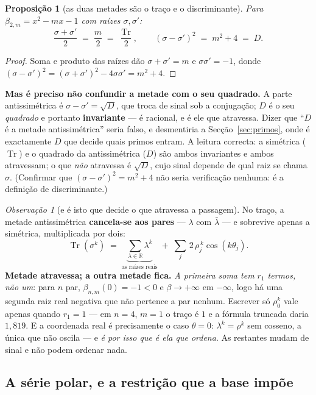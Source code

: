 \documentclass[11pt,a4paper]{article}
\theoremstyle{plain}
\newtheorem{proposicao}[teorema]{Proposição}
\theoremstyle{definition}
\theoremstyle{remark}
\newtheorem{obs}[teorema]{Observação}
\newcommand{\R}{\mathbb{R}}
\begin{document}
\begin{proposicao}[as duas metades são o traço e o discriminante]\label{prop:metades}
Para $\beta_{2,m} = x^2-mx-1$ com raízes $\sigma,\sigma'$:
\[
  \frac{\sigma+\sigma'}{2} \;=\; \frac{m}{2} \;=\; \frac{\operatorname{Tr}}{2} ,
  \qquad
  (\sigma-\sigma')^2 \;=\; m^2+4 \;=\; D .
\]
\end{proposicao}

\begin{proof}
Soma e produto das raízes dão $\sigma+\sigma' = m$ e $\sigma\sigma' = -1$, donde
$(\sigma-\sigma')^2 = (\sigma+\sigma')^2 - 4\sigma\sigma' = m^2+4$.
\end{proof}

\noindent \textbf{Mas é preciso não confundir a metade com o seu quadrado.} A parte antissimétrica
é $\sigma-\sigma' = \sqrt D$, que troca de sinal sob a conjugação; $D$ é o seu \emph{quadrado} e
portanto \textbf{invariante} --- é racional, e é ele que atravessa. Dizer que ``$D$ é a metade
antissimétrica'' seria falso, e desmentiria a Secção~\ref{sec:primos}, onde é exactamente $D$ que
decide quais primos entram. A leitura correcta: a simétrica ($\operatorname{Tr}$) e o quadrado da
antissimétrica ($D$) são ambos invariantes e ambos atravessam; o que \emph{não} atravessa é
$\sqrt D$, cujo sinal depende de qual raiz se chama $\sigma$. (Confirmar que
$(\sigma-\sigma')^2 = m^2+4$ não seria verificação nenhuma: é a definição de discriminante.)

\begin{obs}[e é isto que decide o que atravessa a passagem]
No traço, a metade antissimétrica \textbf{cancela-se aos pares} --- $\lambda$ com $\bar\lambda$ ---
e sobrevive apenas a simétrica, multiplicada por dois:
\[
  \operatorname{Tr}(\sigma^k) \;=\; \underbrace{\sum_{\lambda\in\R}\lambda^k}_{\text{as raízes reais}}
  \;+\; \sum_{j}\, 2\,\rho_j^{\,k}\cos(k\theta_j) .
\]
\textbf{Metade atravessa; a outra metade fica.} \emph{A primeira soma tem $r_1$ termos, não um}:
para $n$ par, $\beta_{n,m}(0) = -1 < 0$ e $\beta \to +\infty$ em $-\infty$, logo há uma segunda raiz
real negativa que não pertence a par nenhum. Escrever só $\rho_0^k$ vale apenas quando $r_1 = 1$ ---
em $n=4$, $m=1$ o traço é $1$ e a fórmula truncada daria $1{,}819$. E a coordenada real é
precisamente o caso $\theta = 0$: $\lambda^k = \rho^k$ sem cosseno, a única que não oscila --- e
\emph{é por isso que é ela que ordena}. As restantes mudam de sinal e não podem ordenar nada.
\end{obs}

\subsection{A série polar, e a restrição que a base impõe}\label{sec:serie}
\end{document}
